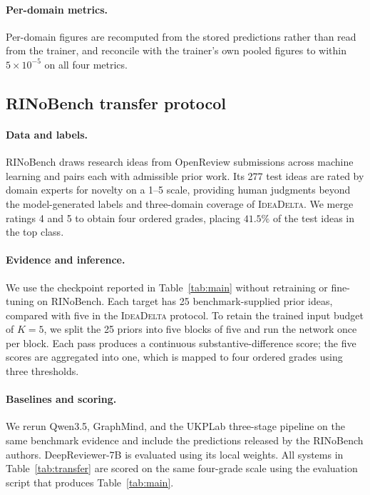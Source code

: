\paragraph{Per-domain metrics.}
Per-domain figures are recomputed from the stored predictions rather than read
from the trainer, and reconcile with the trainer's own pooled figures to within
$5\times10^{-5}$ on all four metrics.

\subsection{RINoBench transfer protocol}
\label{app:transfer}

\paragraph{Data and labels.}
RINoBench \citep{schopf2026rinobench} draws research ideas from OpenReview
submissions across machine learning and pairs each with admissible prior work.
Its 277 test ideas are rated by domain experts for novelty on a 1--5 scale,
providing human judgments beyond the model-generated labels and three-domain
coverage of \textsc{IdeaDelta}. We merge ratings 4 and 5 to obtain four ordered
grades, placing $41.5\%$ of the test ideas in the top class.

\paragraph{Evidence and inference.}
We use the checkpoint reported in Table~\ref{tab:main} without retraining or
fine-tuning on RINoBench. Each target has 25 benchmark-supplied prior ideas,
compared with five in the \textsc{IdeaDelta} protocol. To retain the trained
input budget of $K{=}5$, we split the 25 priors into five blocks of five and
run the network once per block. Each pass produces a continuous
substantive-difference score; the five scores are aggregated into one, which
is mapped to four ordered grades using three thresholds.

\paragraph{Baselines and scoring.}
We rerun Qwen3.5, GraphMind, and the UKPLab three-stage pipeline on the same
benchmark evidence and include the predictions released by the RINoBench
authors. DeepReviewer-7B is evaluated using its local weights.
All systems in Table~\ref{tab:transfer} are scored on the same four-grade scale
using the evaluation script that produces Table~\ref{tab:main}.

